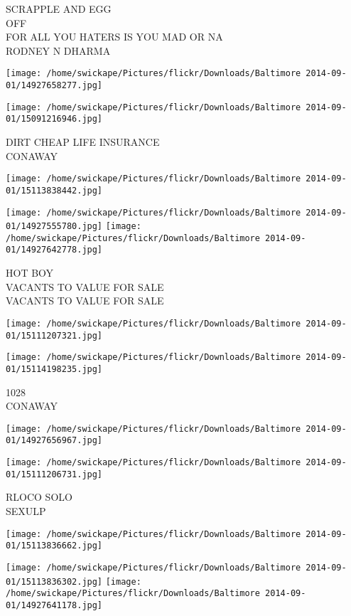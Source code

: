 \documentclass[10pt,letterpaper]{article}
\begin{document}
SCRAPPLE AND EGG\\
OFF\\
FOR ALL YOU HATERS IS YOU MAD OR NA\\
RODNEY N DHARMA
\pagebreak

\texttt{[image: /home/swickape/Pictures/flickr/Downloads/Baltimore 2014-09-01/14927658277.jpg]}

\vspace{0.25in}
\texttt{[image: /home/swickape/Pictures/flickr/Downloads/Baltimore 2014-09-01/15091216946.jpg]}

DIRT CHEAP LIFE INSURANCE\\
CONAWAY
\pagebreak

\texttt{[image: /home/swickape/Pictures/flickr/Downloads/Baltimore 2014-09-01/15113838442.jpg]}

\vspace{0.25in}
\texttt{[image: /home/swickape/Pictures/flickr/Downloads/Baltimore 2014-09-01/14927555780.jpg]}
\texttt{[image: /home/swickape/Pictures/flickr/Downloads/Baltimore 2014-09-01/14927642778.jpg]}

HOT BOY\\
VACANTS TO VALUE FOR SALE\\
VACANTS TO VALUE FOR SALE
\pagebreak

\texttt{[image: /home/swickape/Pictures/flickr/Downloads/Baltimore 2014-09-01/15111207321.jpg]}

\vspace{0.25in}
\texttt{[image: /home/swickape/Pictures/flickr/Downloads/Baltimore 2014-09-01/15114198235.jpg]}

1028\\
CONAWAY
\pagebreak

\texttt{[image: /home/swickape/Pictures/flickr/Downloads/Baltimore 2014-09-01/14927656967.jpg]}

\vspace{0.25in}
\texttt{[image: /home/swickape/Pictures/flickr/Downloads/Baltimore 2014-09-01/15111206731.jpg]}

RLOCO SOLO\\
SEXULP
\pagebreak

\texttt{[image: /home/swickape/Pictures/flickr/Downloads/Baltimore 2014-09-01/15113836662.jpg]}

\vspace{0.25in}
\texttt{[image: /home/swickape/Pictures/flickr/Downloads/Baltimore 2014-09-01/15113836302.jpg]}
\texttt{[image: /home/swickape/Pictures/flickr/Downloads/Baltimore 2014-09-01/14927641178.jpg]}
\end{document}
